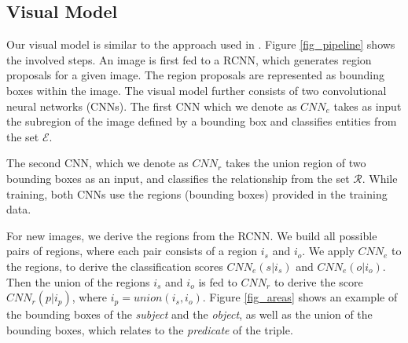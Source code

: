\documentclass[runningheads,a4paper]{llncs}
\begin{document}



\subsection{Visual Model}
Our visual model is similar to the approach used in \cite{visual}. Figure \ref{fig_pipeline} shows the involved steps. An image is first fed to a RCNN, which generates region proposals for a given image. The region proposals are represented as bounding boxes within the image. The visual model further consists of two convolutional neural networks (CNNs). The first CNN which we denote as $\textit{CNN}_e$ takes as input the subregion of the image defined by a bounding box and classifies entities from the set $\mathcal{E}$. 

The second CNN, which we denote as $\textit{CNN}_r$ takes the union region of two bounding boxes as an input, and classifies the relationship from the set $\mathcal{R}$. While training, both CNNs use the regions (bounding boxes) provided in the training data. 

For new images, we derive the regions from the RCNN. We build all possible pairs of regions, where each pair consists of a region $i_s$ and $i_o$. We apply $\textit{CNN}_e$ to the regions, to derive the classification scores $\textit{CNN}_e(s | i_s)$ and $\textit{CNN}_e(o | i_o)$. Then the union of the regions $i_s$ and $i_o$ is fed to $\textit{CNN}_r$ to derive the score $\textit{CNN}_r(p | i_p)$, where $i_p = union(i_s, i_o)$. Figure \ref{fig_areas} shows an example of the bounding boxes of the \textit{subject} and the \textit{object}, as well as the union of the bounding boxes, which relates to the \textit{predicate} of the triple.



%
%
\end{document}
